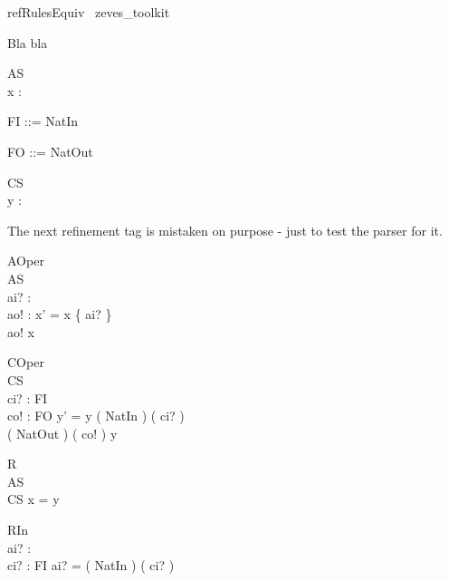 \begin{zsection}	 \SECTION refRulesEquiv \parents~zeves\_toolkit
\end{zsection}



Bla bla

\begin{schema}{AS}
\\
 x : \power \nat
\end{schema}


\begin{zed}FI ::= NatIn \ldata \nat \rdata
\end{zed}

\begin{zed}FO ::= NatOut \ldata \nat \rdata
\end{zed}



\begin{schema}{CS}
\\
 y : \seq \nat
\end{schema}



The next refinement tag is mistaken on purpose - just to test the parser for it.

\begin{schema}{AOper}
\\
 \Delta AS \\
 ai? : \nat \\
 ao! : \nat 
\where
 x' = x \cup \{ ai? \} \\
 ao! \in x
\end{schema}



\begin{schema}{COper}
\\
 \Delta CS \\
 ci? : FI \\
 co! : FO 
\where
 y' = y \cat \langle ( NatIn \inv ) ( ci? ) \rangle \\
 ( NatOut \inv ) ( co! ) \in \ran y
\end{schema}



\begin{schema}{R}
\\
 AS \\
 CS 
\where
 x = \ran y
\end{schema}



\begin{schema}{RIn}
\\
 ai? : \nat \\
 ci? : FI 
\where
 ai? = ( NatIn \inv ) ( ci? )
\end{schema}




